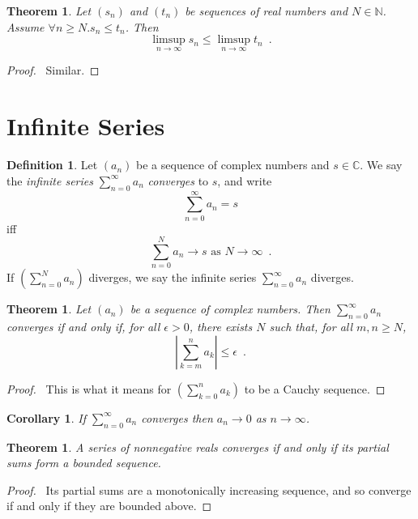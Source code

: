 \documentclass{book}
\let\qed\relax
\newtheorem{cor}{Corollary}[prop]
\newtheorem{thm}[prop]{Theorem}
\theoremstyle{definition}
\newtheorem{df}[prop]{Definition}
\begin{document}
\begin{thm}
Let $(s_n)$ and $(t_n)$ be sequences of real numbers and $N \in \mathbb{N}$. Assume $\forall n \geq N. s_n \leq t_n$. Then
\[ \limsup_{n \rightarrow \infty} s_n \leq \limsup_{n \rightarrow \infty} t_n \enspace . \]
\end{thm}

\begin{proof}
\pf\ Similar. \qed
\end{proof}

\section{Infinite Series}

\begin{df}
Let $(a_n)$ be a sequence of complex numbers and $s \in \mathbb{C}$. We say the \emph{infinite series} $\sum_{n=0}^\infty a_n$ \emph{converges} to $s$, and write
\[ \sum_{n=0}^\infty a_n = s \]
iff
\[ \sum_{n=0}^N a_n \rightarrow s \text{ as } N \rightarrow \infty \enspace . \]
If $(\sum_{n=0}^N a_n)$ diverges, we say the infinite series $\sum_{n=0}^\infty a_n$ diverges.
\end{df}

\begin{thm}
Let $(a_n)$ be a sequence of complex numbers. Then $\sum_{n=0}^\infty a_n$ converges if and only if, for all $\epsilon > 0$, there exists $N$ such that, for all $m,n \geq N$,
\[ \left| \sum_{k=m}^n a_k \right| \leq \epsilon \enspace . \]
\end{thm}

\begin{proof}
\pf\ This is what it means for $(\sum_{k=0}^n a_k)$ to be a Cauchy sequence. \qed
\end{proof}

\begin{cor}
If $\sum_{n=0}^\infty a_n$ converges then $a_n \rightarrow 0$ as $n \rightarrow \infty$.
\end{cor}

\begin{thm}
A series of nonnegative reals converges if and only if its partial sums form a bounded sequence.
\end{thm}

\begin{proof}
\pf\ Its partial sums are a monotonically increasing sequence, and so converge if and only if they are bounded above. \qed
\end{proof}
\end{document}
